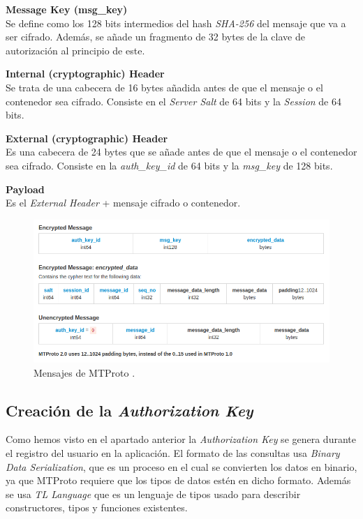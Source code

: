 \begin{description}
	\item \textbf{Message Key (msg\_key)}\\
	Se define como los 128 bits intermedios del hash \emph{SHA-256} del mensaje que va a ser cifrado. Además, se añade un fragmento de 32 bytes de la clave de autorización al principio de este.

	\item \textbf{Internal (cryptographic) Header}\\
	Se trata de una cabecera de 16 bytes añadida antes de que el mensaje o el contenedor sea cifrado. Consiste en el \emph{Server Salt} de 64 bits y la \emph{Session} de 64 bits.

	\item \textbf{External (cryptographic) Header}\\
	Es una cabecera de 24 bytes que se añade antes de que el mensaje o el contenedor sea cifrado. Consiste en la \emph{auth\_key\_id} de 64 bits y la \emph{msg\_key} de 128 bits.

	\item \textbf{Payload}\\
	Es el \emph{External Header} + mensaje cifrado o contenedor.
\end{description}

\begin{figure}[htb]
	\centering
	\includegraphics[scale=0.45]{imagenes/MTProto2.png} 
	\caption{Mensajes de MTProto \cite{WebProto}.}
	\label{mtproto1}
\end{figure}

\subsection{Creación de la \emph{Authorization Key}}
Como hemos visto en el apartado anterior la \emph{Authorization Key} se genera durante el registro del usuario en la aplicación. El formato de las consultas usa \emph{Binary Data Serialization}, que es un proceso en el cual se convierten los datos en binario, ya que MTProto requiere que los tipos de datos estén en dicho formato. Además se usa \emph{TL Language} que es un lenguaje de tipos usado para describir constructores, tipos y funciones existentes.

